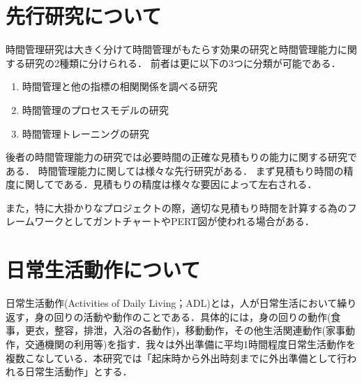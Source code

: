 \section{先行研究について}
時間管理研究は大きく分けて時間管理がもたらす効果の研究と時間管理能力に関する研究の2種類に分けられる．
前者は更に以下の3つに分類が可能である．
\begin{enumerate}
  \item 時間管理と他の指標の相関関係を調べる研究
  \item 時間管理のプロセスモデルの研究
  \item 時間管理トレーニングの研究
\end{enumerate}

後者の時間管理能力の研究では必要時間の正確な見積もりの能力に関する研究である．
時間管理能力に関しては様々な先行研究がある．
まず見積もり時間の精度に関してである．見積もりの精度は様々な要因によって左右される．



また，特に大掛かりなプロジェクトの際，適切な見積もり時間を計算する為のフレームワークとしてガントチャートやPERT図が使われる場合がある．%

\section{日常生活動作について}
日常生活動作(Activities of Daily Living；ADL)とは，人が日常生活において繰り返す，身の回りの活動や動作のことである．具体的には，身の回りの動作(食事，更衣，整容，排泄，入浴の各動作)，移動動作，その他生活関連動作(家事動作，交通機関の利用等)を指す\cite{Sakai2003}．我々は外出準備に平均1時間程度日常生活動作を複数こなしている\cite{duhouse}．本研究では「起床時から外出時刻までに外出準備として行われる日常生活動作」とする．

